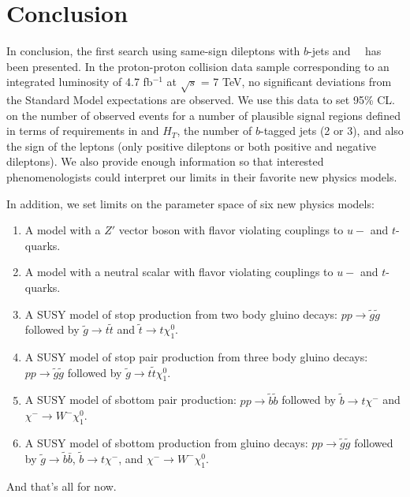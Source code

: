 \section{Conclusion}
\label{sec:conclusion}
In conclusion, the first search using same-sign dileptons with $b$-jets and \met~~has 
been presented. In the
proton-proton collision data sample corresponding to an integrated luminosity of 
 4.7 fb$^{-1}$ at $\sqrt{s}$ = 7 TeV,
no significant deviations from the Standard Model expectations are observed. 
We use this data to set 95\% CL. on the
number of observed events for a number of plausible signal regions
defined in terms of requirements in \met and $H_T$, the number of
$b$-tagged jets (2 or 3), and also the sign of the leptons (only positive dileptons
or both positive and negative dileptons).
We also provide enough information so that interested phenomenologists
could interpret our limits in their favorite new physics models.

In addition, we set limits on the parameter space of six new physics models:
\begin{enumerate}
\item A model with a $Z'$ vector boson with flavor violating couplings to $u-$ and $t$-quarks.

\item A model with a neutral scalar with flavor violating couplings to $u-$ and $t$-quarks.

\item A SUSY model of stop production from two body gluino decays: 
$pp \to \widetilde{g} \widetilde{g}$ followed by
$\widetilde{g} \to t\widetilde{t}$ and $\widetilde{t} \to t \chi_1^0$.

\item A SUSY model of stop pair production from three body gluino decays:
$pp \to \widetilde{g} \widetilde{g}$ followed by
$\widetilde{g} \to t\widetilde{t}\chi_1^0$.

\item A SUSY model of sbottom pair production: $pp \to \tilde{b}\tilde{b}$ followed
by $\tilde{b} \to t\chi^{-}$ and $\chi^{-} \to W^- \chi_1^0$.

\item A SUSY model of sbottom production from gluino decays:
$pp \to \widetilde{g} \widetilde{g}$ followed by
$\widetilde{g} \to \widetilde{b}\bar{b}$,
$\widetilde{b} \to t\chi^-$, and $\chi^{-} \to W^- \chi_1^0$.
\end{enumerate}

And that's all for now.
